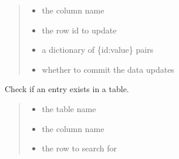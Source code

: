 \documentclass[letterpaper,12pt,english]{sphinxmanual}
\begin{document}
\begin{fulllineitems}
\begin{fulllineitems}
\begin{quote}
\begin{description}
\begin{itemize}
\item {} 
\sphinxAtStartPar
{} \textendash{} the column name

\item {} 
\sphinxAtStartPar
{} \textendash{} the row id to update

\item {} 
\sphinxAtStartPar
{} \textendash{} a dictionary of \{id:value\} pairs

\item {} 
\sphinxAtStartPar
{} \textendash{} whether to commit the data updates

\end{itemize}

\end{description}\end{quote}

\end{fulllineitems}


\begin{fulllineitems}
\label{\detokenize{api/networking:cbmpy.CBNetDB.DBTools.checkEntryInColumn}}
\pysigstartsignatures
\pysiglinewithargsret
{}
{\sphinxparamcomma {}\sphinxparamcomma {}}
{}
\pysigstopsignatures
\sphinxAtStartPar
Check if an entry exists in a table.
\begin{quote}\begin{description}
\begin{itemize}
\item {} 
\sphinxAtStartPar
{} \textendash{} the table name

\item {} 
\sphinxAtStartPar
{} \textendash{} the column name

\item {} 
\sphinxAtStartPar
{} \textendash{} the row to search for

\end{itemize}


\end{description}
\end{quote}
\end{fulllineitems}
\end{fulllineitems}
\end{document}
